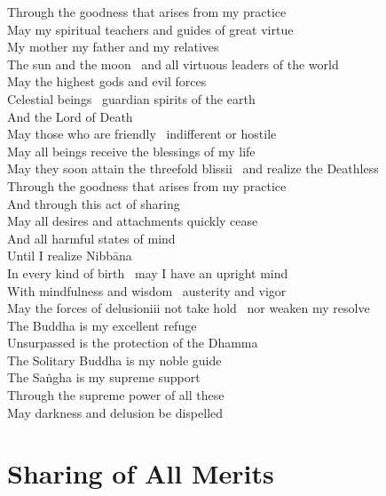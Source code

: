 \begin{cprenglish}
  Through the goodness that arises from my practice\\
  May my spiritual teachers and guides of great virtue\\
  My mother my father and my relatives\\
  The sun and the moon \breathmark\ and all virtuous leaders of the world\\
  May the highest gods and evil forces\\
  Celestial beings \breathmark\ guardian spirits of the earth\\
  And the Lord of Death\\
  May those who are friendly \breathmark\ indifferent or hostile\\
  May all beings receive the blessings of my life\\
  May they soon attain the threefold blissii \breathmark\ and realize the Deathless\\
  Through the goodness that arises from my practice\\
  And through this act of sharing\\
  May all desires and attachments quickly cease\\
  And all harmful states of mind\\
  Until I realize Nibbāna\\
  In every kind of birth \breathmark\ may I have an upright mind\\
  With mindfulness and wisdom \breathmark\ austerity and vigor\\
  May the forces of delusioniii not take hold \breathmark\ nor weaken my resolve\\
  The Buddha is my excellent refuge\\
  Unsurpassed is the protection of the Dhamma\\
  The Solitary Buddha is my noble guide\\
  The Saṅgha is my supreme support\\
  Through the supreme power of all these\\
  May darkness and delusion be dispelled
\end{cprenglish}

\suttaRef{[Trad]}

\clearpage

\section{Sharing of All Merits}
\label{sharing-all-merits}

